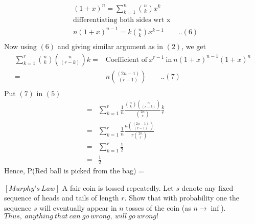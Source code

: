 \documentclass[12pt]{article}
\begin{document}
\begin{solution}
        \begin{align*}
            &(1+x)^n=  \sum_{k=1}^{n}{n \choose k}x^k\\
            &\text{differentiating both sides wrt x}\\
            &n(1+x)^{n-1}=k{n \choose k}x^{k-1} \quad\quad ..(6)\\
        \end{align*}
        Now using $(6)$ and giving similar argument as in $(2)$, we get
        \begin{align*}
             \sum_{k=1}^{r}{n \choose k}{n \choose (r-k)}k=& \text{Coefficient of}\: x^{r-1} \:\text{in} \:n(1+x)^{n-1}(1+x)^n\\
            =& n{(2n-1) \choose (r-1)} \quad\quad ..(7)\\
        \end{align*}
        Put $(7)$ in $(5)$
        \begin{align*}
             = & \sum_{k=1}^{r}\frac{1}{n}\frac{{n \choose k}{n \choose (r-k)}}{{2n \choose r}}\frac{k}{r}\quad\quad\\
             = & \sum_{k=1}^{r}\frac{1}{n}\frac{n{(2n-1) \choose (r-1)}}{r{2n \choose r}}\quad\quad\\
             = & \sum_{k=1}^{r}\frac{1}{2}\\
             = & \frac{1}{2}
        \end{align*}
        Hence, P(Red ball is picked from the bag) = 
    \end{solution}

    \begin{question}
        $[Murphy’s \:Law]$ A fair coin is tossed repeatedly. Let $s$ denote any fixed sequence of heads and tails of length $r$. Show that with probability one the sequence $s$ will eventually appear in $n$ tosses of the coin (as $n \rightarrow \inf$). \\$Thus, \:anything \:that\: can\: go\: wrong,\: will\: go\: wrong!$
    \end{question}
       
\end{document}
